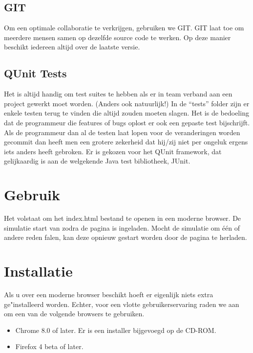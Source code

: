 \documentclass[a4paper,oneside]{report}
\begin{document}
\subsection{GIT}
Om een optimale collaboratie te verkrijgen, gebruiken we GIT.
GIT laat toe om meerdere mensen samen op dezelfde source code te werken.
Op deze manier beschikt iedereen altijd over de laatste versie.
\subsection{QUnit Tests}
Het is altijd handig om test suites te hebben als er in team verband aan een project gewerkt moet worden. (Anders ook natuurlijk!)
In de ``tests'' folder zijn er enkele testen terug te vinden die altijd zouden moeten slagen.
Het is de bedoeling dat de programmeur die features of bugs oplost er ook een gepaste test bijschrijft.
Als de programmeur dan al de testen laat lopen voor de veranderingen worden gecommit dan heeft men een 
grotere zekerheid dat hij/zij niet per ongeluk ergens iets anders heeft gebroken.
Er is gekozen voor het QUnit framework, dat gelijkaardig is aan de welgekende Java test bibliotheek, JUnit.

\section{Gebruik}
Het volstaat om het index.html bestand te openen in een moderne browser. De simulatie start van zodra de pagina is ingeladen.
Mocht de simulatie om \'{e}\'{e}n of andere reden falen, kan deze opnieuw gestart worden door de pagina te herladen.
\section{Installatie}
Als u over een moderne browser beschikt hoeft er eigenlijk niets extra ge"installeerd worden.
Echter, voor een vlotte gebruikerservaring raden we aan om een van de volgende browsers te gebruiken.
\begin{itemize}
\item Chrome 8.0 of later. Er is een installer bijgevoegd op de CD-ROM.
\item Firefox 4 beta of later.
\end{itemize}
\end{document}
